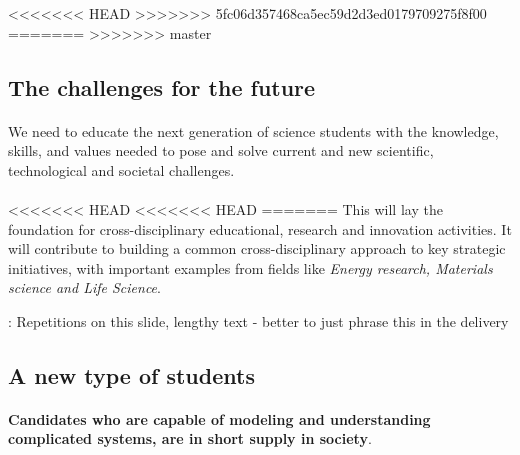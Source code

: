 \documentclass[%
<<<<<<< HEAD
<<<<<<< HEAD
oneside,                 %
final,                   %
=======
twoside,                 %
final,                   %
>>>>>>> 5fc06d357468ca5ec59d2d3ed0179709275f8f00
=======
oneside,                 %
final,                   %
>>>>>>> master
10pt]{article}
\newcommand{\shortinlinecomment}[3]{{\color{red}{\bf #1}: #2}}
\begin{document}
\begin{itemize}
<<<<<<< HEAD
>>>>>>> 5fc06d357468ca5ec59d2d3ed0179709275f8f00
=======
>>>>>>> master




\subsection*{The challenges for the future}

\paragraph{}
We need to educate the next generation of
science students with the knowledge, skills, and values needed to pose
and solve current and new scientific, technological and societal
challenges.



\paragraph{}
<<<<<<< HEAD
<<<<<<< HEAD
=======
This will lay the foundation for cross-disciplinary
educational, research and innovation activities. It will contribute to building a common cross-disciplinary
approach to key strategic initiatives, with important examples from fields like  \emph{Energy research, Materials science and  Life Science}.



\shortinlinecomment{hpl 2}{ Repetitions on this slide, lengthy text - better to just phrase this in the delivery }{ Repetitions on this slide, }




\subsection*{A new type of students}

\paragraph{}
\textbf{Candidates who are capable of modeling and understanding complicated
systems, are in short supply in society}.




\end{itemize}
\end{document}
